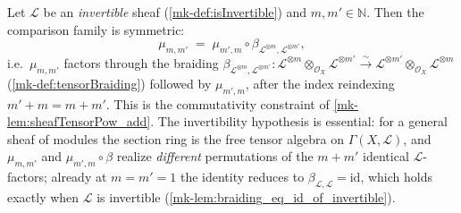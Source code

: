 \begin{lemma}\label{mk-lem:tensorPowAdd_comm}
  \leanok

  Let \(\mathcal{L}\) be an \emph{invertible} sheaf (\ref{mk-def:isInvertible}) and
  \(m, m' \in \mathbb{N}\). Then the comparison family is symmetric:
  \[
    \mu_{m,m'} \;=\;
      \mu_{m',m} \circ
      \beta_{\mathcal{L}^{\otimes m}, \mathcal{L}^{\otimes m'}},
  \]
  i.e.\ \(\mu_{m,m'}\) factors through the braiding
  \(\beta_{\mathcal{L}^{\otimes m},\mathcal{L}^{\otimes m'}} :
  \mathcal{L}^{\otimes m} \otimes_{\mathcal{O}_X} \mathcal{L}^{\otimes m'}
  \xrightarrow{\sim}
  \mathcal{L}^{\otimes m'} \otimes_{\mathcal{O}_X} \mathcal{L}^{\otimes m}\)
  (\ref{mk-def:tensorBraiding}) followed by \(\mu_{m',m}\), after the index
  reindexing \(m' + m = m + m'\). This is the commutativity constraint of
  \ref{mk-lem:sheafTensorPow_add}. The invertibility hypothesis is essential: for a
  general sheaf of modules the section ring is the free tensor algebra on
  \(\Gamma(X,\mathcal{L})\), and \(\mu_{m,m'}\) and \(\mu_{m',m} \circ \beta\)
  realize \emph{different} permutations of the \(m + m'\) identical
  \(\mathcal{L}\)-factors; already at \(m = m' = 1\) the identity reduces to
  \(\beta_{\mathcal{L},\mathcal{L}} = \mathrm{id}\), which holds exactly when
  \(\mathcal{L}\) is invertible (\ref{mk-lem:braiding_eq_id_of_invertible}).
\end{lemma}


